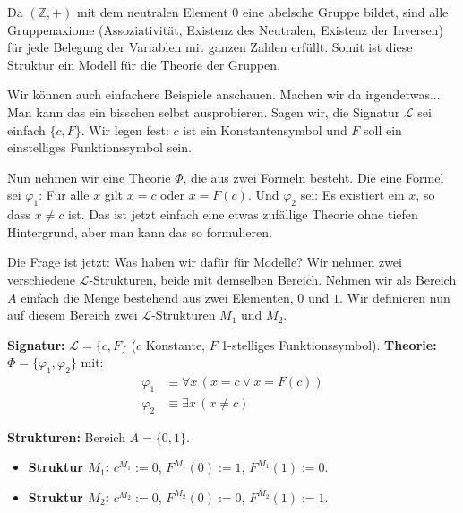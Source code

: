 \begin{math-stroke}

\begin{explanation-of-steps}
Da $(\mathbb{Z}, +)$ mit dem neutralen Element $0$ eine abelsche Gruppe bildet, sind alle Gruppenaxiome (Assoziativität, Existenz des Neutralen, Existenz der Inversen) für jede Belegung der Variablen mit ganzen Zahlen erfüllt. Somit ist diese Struktur ein Modell für die Theorie der Gruppen.
\end{explanation-of-steps}
\end{math-stroke}

\begin{spoken-clean}[01:22:55 - 01:25:32]
Wir können auch einfachere Beispiele anschauen. Machen wir da irgendetwas... Man kann das ein bisschen selbst ausprobieren. Sagen wir, die Signatur $\mathcal{L}$ sei einfach $\{c, F\}$. Wir legen fest: $c$ ist ein Konstantensymbol und $F$ soll ein einstelliges Funktionssymbol sein.

Nun nehmen wir eine Theorie $\Phi$, die aus zwei Formeln besteht. Die eine Formel sei $\varphi_1$: Für alle $x$ gilt $x = c$ oder $x = F(c)$. Und $\varphi_2$ sei: Es existiert ein $x$, so dass $x \neq c$ ist. Das ist jetzt einfach eine etwas zufällige Theorie ohne tiefen Hintergrund, aber man kann das so formulieren.

Die Frage ist jetzt: Was haben wir dafür für Modelle? Wir nehmen zwei verschiedene $\mathcal{L}$-Strukturen, beide mit demselben Bereich. Nehmen wir als Bereich $A$ einfach die Menge bestehend aus zwei Elementen, $0$ und $1$. Wir definieren nun auf diesem Bereich zwei $\mathcal{L}$-Strukturen $M_1$ und $M_2$.
\end{spoken-clean}

\begin{math-stroke}
\textbf{Signatur:} $\mathcal{L} = \{c, F\}$ ($c$ Konstante, $F$ 1-stelliges Funktionssymbol).
\textbf{Theorie:} $\Phi = \{\varphi_1, \varphi_2\}$ mit:
\begin{align*}
    \varphi_1 &\equiv \forall x \, (x = c \lor x = F(c)) \\
    \varphi_2 &\equiv \exists x \, (x \neq c)
\end{align*}

\textbf{Strukturen:} Bereich $A = \{0, 1\}$.
\begin{itemize}
    \item \textbf{Struktur $M_1$:} $c^{M_1} := 0$, $F^{M_1}(0) := 1$, $F^{M_1}(1) := 0$.
    \item \textbf{Struktur $M_2$:} $c^{M_2} := 0$, $F^{M_2}(0) := 0$, $F^{M_2}(1) := 1$.
\end{itemize}
\end{math-stroke}

